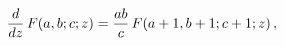 \[\frac{d}{dz}\mathop{F\/}\nolimits\!\left(a,b;c;z\right)=\frac{ab}{c}\mathop{F%
\/}\nolimits\!\left(a+1,b+1;c+1;z\right),\]